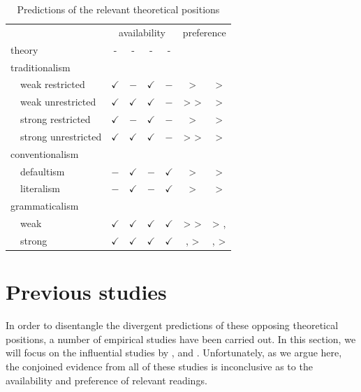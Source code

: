 \documentclass[fleqn,reqno,10pt,draft]{article}
\newcommand{\lit}{\acro{lit}}
\newcommand{\glb}{\acro{glb}}
\newcommand{\loc}{\acro{loc}}
\newcommand{\as}{\acro{as}}
\renewcommand{\es}{\acro{es}}
\begin{document}
\begin{table}[t]
  \centering
  \begin{tabular}{lcccccc}
    & \multicolumn{4}{c}{availability} 
    & \multicolumn{2}{c}{preference}
    \\ \cmidrule(r){2-5}  \cmidrule(r){6-7}
    theory
    & \as-\glb
    & \as-\loc
    & \es-\glb
    & \es-\loc
    & \as
    & \es
    \\ \midrule
    traditionalism
    \\
    \ \ weak restricted 
    & $\checkmark$
    & $-$
    & $\checkmark$
    & $-$
    & \lit > \glb 
    & \lit > \glb
    \\
    \ \ weak unrestricted
    & $\checkmark$
    & $\checkmark$
    & $\checkmark$
    & $-$
    & \lit > \glb > \loc 
    & \lit > \glb
    \\
    \ \ strong restricted
    & $\checkmark$
    & $-$
    & $\checkmark$
    & $-$
    & \glb > \lit 
    & \glb > \lit
    \\
    \ \ strong unrestricted
    & $\checkmark$
    & $\checkmark$
    & $\checkmark$
    & $-$
    & \glb > \loc > \lit 
    & \glb > \lit
    \\
    conventionalism
    \\
    \ \ defaultism
    & $-$
    & $\checkmark$
    & $-$
    & $\checkmark$
    & \loc >  \lit 
    & \loc >  \lit
    \\
    \ \ literalism
    & $-$
    & $\checkmark$
    & $-$
    & $\checkmark$
    & \lit >  \loc 
    & \lit >  \loc
    \\
    grammaticalism
    \\
    \ \ weak
    & $\checkmark$
    & $\checkmark$
    & $\checkmark$
    & $\checkmark$
    & \loc > \glb > \lit 
    & \glb > \lit, \loc
    \\
    \ \ strong
    & $\checkmark$
    & $\checkmark$
    & $\checkmark$
    & $\checkmark$
    & \glb, \loc > \lit 
    & \glb, \loc >  \lit
    \\
  \end{tabular}
  \caption{Predictions of the relevant theoretical positions}
  \label{tab:predictions}
\end{table}




\section{Previous studies}
\label{sec:previous-studies}

In order to disentangle the divergent predictions of these opposing
theoretical positions, a number of empirical studies have been carried
out. In this section, we will focus on the influential studies by
\citet{GeurtsPouscoulous2009:Embedded-Implic},
\citet{CliftonDube2010:Embedded-Implic} and
\citet{ChemlaSpector2010:Experimental-Ev}. Unfortunately, as we argue
here, the conjoined evidence from all of these studies is inconclusive
as to the availability and preference of relevant readings.
\end{document}
